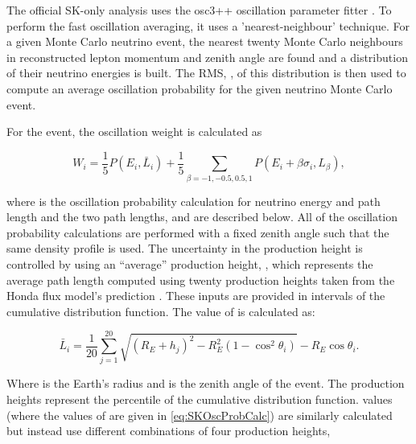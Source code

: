 The official SK-only analysis uses the osc3++ oscillation parameter fitter \cite{thesis_roger}. To perform the fast oscillation averaging, it uses a 'nearest-neighbour' technique. For a given Monte Carlo neutrino event, the nearest twenty Monte Carlo neighbours in reconstructed lepton momentum and zenith angle are found and a distribution of their neutrino energies is built. The RMS, \quickmath{\sigma}, of this distribution is then used to compute an average oscillation probability for the given neutrino Monte Carlo event. 

For the  event, the oscillation weight is calculated as

\begin{equation}
  \label{eq:SKOscProbCalc}
  W_{i} = \frac{1}{5} P(E_{i},\bar{L}_{i}) + \frac{1}{5} \sum_{\beta = -1, -0.5, 0.5, 1} P(E_{i} + \beta\sigma_{i},L_{\beta}),
\end{equation}

where  is the oscillation probability calculation for neutrino energy  and path length  and the two path lengths,  and  are described below. All of the oscillation probability calculations are performed with a fixed zenith angle such that the same density profile is used. The uncertainty in the production height is controlled by using an ``average'' production height, , which represents the average path length computed using twenty production heights taken from the Honda flux model's prediction \cite{Honda:2011}. These inputs are provided in  intervals of the cumulative distribution function. The value of  is calculated as:

\begin{equation}
  \bar{L}_{i} = \frac{1}{20} \sum^{20}_{j=1} \sqrt{ \left(R_{E} + h_{j} \right)^{2} - R_{E}^{2} \left(1 - \cos^{2}\theta_{i} \right) } - R_{E} \cos\theta_{i}.
\end{equation}

Where  is the Earth's radius and  is the zenith angle of the  event. The production heights  represent the  percentile of the cumulative distribution function.  values (where the values of \quickmath{\beta} are given in \autoref{eq:SKOscProbCalc}) are similarly calculated but instead use different combinations of four production heights,

